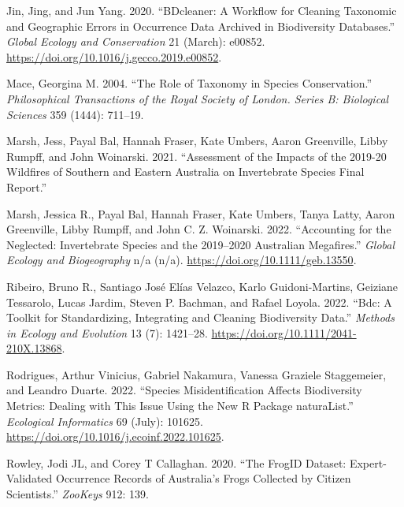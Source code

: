 \documentclass[
  letterpaper,
  DIV=11,
  numbers=noendperiod,
  oneside]{scrreprt}
\newlength{\cslhangindent}
\newlength{\cslentryspacingunit} %
\newenvironment{CSLReferences}[2] %
 {%
  \setlength{\parindent}{0pt}
  \ifodd #1
  \let\oldpar\par
  \def\par{\hangindent=\cslhangindent\oldpar}
  \fi
  \setlength{\parskip}{#2\cslentryspacingunit}
 }%
 {}
\begin{document}
\begin{CSLReferences}{1}{0}
\leavevmode{}%
Jin, Jing, and Jun Yang. 2020. {``BDcleaner: A Workflow for Cleaning
Taxonomic and Geographic Errors in Occurrence Data Archived in
Biodiversity Databases.''} \emph{Global Ecology and Conservation} 21
(March): e00852. \url{https://doi.org/10.1016/j.gecco.2019.e00852}.

\leavevmode{}%
Mace, Georgina M. 2004. {``The Role of Taxonomy in Species
Conservation.''} \emph{Philosophical Transactions of the Royal Society
of London. Series B: Biological Sciences} 359 (1444): 711--19.

\leavevmode{}%
Marsh, Jess, Payal Bal, Hannah Fraser, Kate Umbers, Aaron Greenville,
Libby Rumpff, and John Woinarski. 2021. {``Assessment of the Impacts of
the 2019-20 Wildfires of Southern and Eastern Australia on Invertebrate
Species Final Report.''}

\leavevmode{}%
Marsh, Jessica R., Payal Bal, Hannah Fraser, Kate Umbers, Tanya Latty,
Aaron Greenville, Libby Rumpff, and John C. Z. Woinarski. 2022.
{``Accounting for the Neglected: {Invertebrate} Species and the
2019--2020 {Australian} Megafires.''} \emph{Global Ecology and
Biogeography} n/a (n/a). \url{https://doi.org/10.1111/geb.13550}.

\leavevmode{}%
Ribeiro, Bruno R., Santiago José Elías Velazco, Karlo Guidoni-Martins,
Geiziane Tessarolo, Lucas Jardim, Steven P. Bachman, and Rafael Loyola.
2022. {``Bdc: {A} Toolkit for Standardizing, Integrating and Cleaning
Biodiversity Data.''} \emph{Methods in Ecology and Evolution} 13 (7):
1421--28. \url{https://doi.org/10.1111/2041-210X.13868}.

\leavevmode{}%
Rodrigues, Arthur Vinicius, Gabriel Nakamura, Vanessa Graziele
Staggemeier, and Leandro Duarte. 2022. {``Species Misidentification
Affects Biodiversity Metrics: {Dealing} with This Issue Using the New
{R} Package {naturaList}.''} \emph{Ecological Informatics} 69 (July):
101625. \url{https://doi.org/10.1016/j.ecoinf.2022.101625}.

\leavevmode{}%
Rowley, Jodi JL, and Corey T Callaghan. 2020. {``The FrogID Dataset:
Expert-Validated Occurrence Records of Australia's Frogs Collected by
Citizen Scientists.''} \emph{ZooKeys} 912: 139.


\end{CSLReferences}
\end{document}
